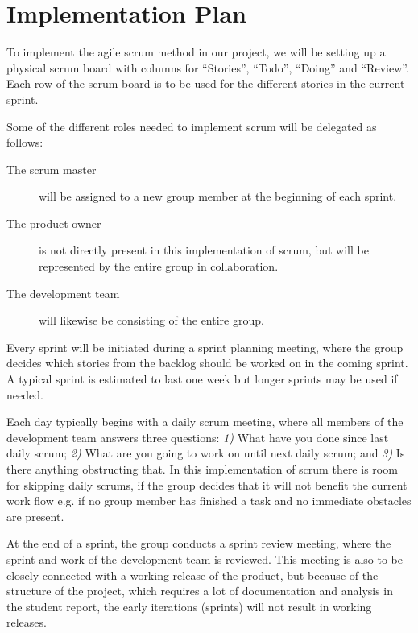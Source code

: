 \chapter{Implementation Plan} %
\label{cha:implementation_plan}
To implement the agile scrum method in our project, we will be setting up a physical scrum board with columns for “Stories”, “Todo”, “Doing” and “Review”. Each row of the scrum board is to be used for the different stories in the current sprint. 

Some of the different roles needed to implement scrum will be delegated as follows:
\begin{description}
    \item[The scrum master] will be assigned to a new group member at the beginning of each sprint.
    \item[The product owner] is not directly present in this implementation of scrum, but will be represented by the entire group in collaboration.
    \item[The development team] will likewise be consisting of the entire group.
\end{description}

Every sprint will be initiated during a sprint planning meeting, where the group decides which stories from the backlog should be worked on in the coming sprint. 
A typical sprint is estimated to last one week but longer sprints may be used if needed. 

Each day typically begins with a daily scrum meeting, where all members of the development team answers three questions: \emph{1)} What have you done since last daily scrum; \emph{2)} What are you going to work on until next daily scrum; and \emph{3)} Is there anything obstructing that. 
In this implementation of scrum there is room for skipping daily scrums, if the group decides that it will not benefit the current work flow e.g. if no group member has finished a task and no immediate obstacles are present. 

At the end of a sprint, the group conducts a sprint review meeting, where the sprint and work of the development team is reviewed. 
This meeting is also to be closely connected with a working release of the product, but because of the structure of the project, which requires a lot of documentation and analysis in the student report, the early iterations (sprints) will not result in working releases.


